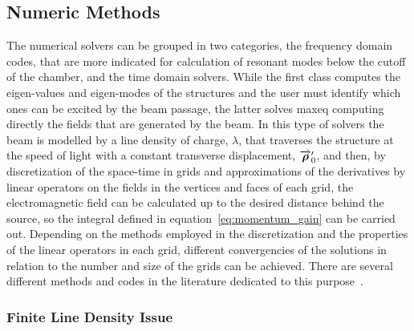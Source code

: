 \subsection{Numeric Methods}\label{ssec:numeric_methods}

    The numerical solvers can be grouped in two categories, the frequency domain codes, that are more indicated for calculation of resonant modes below the cutoff of the chamber, and the time domain solvers. While the first class computes the eigen-values and eigen-modes of the structures and the user must identify which ones can be excited by the beam passage, the latter solves \gls{maxeq} computing directly the fields that are generated by the beam. In this type of solvers the beam is modelled by a line density of charge, $\lambda$, that traverses the structure at the speed of light with a constant transverse displacement, $\overrightarrow{\boldsymbol{\rho}}'_0$, and then, by discretization of the space-time in grids and approximations of the derivatives by linear operators on the fields in the vertices and faces of each grid, the electromagnetic field can be calculated up to the desired distance behind the source, so the integral defined in equation~\eqref{eq:momentum_gain} can be carried out. Depending on the methods employed in the discretization and the properties of the linear operators in each grid, different convergencies of the solutions in relation to the number and size of the grids can be achieved. There are several different methods and codes in the literature dedicated to this purpose~\cite{some}.

\subsubsection{Finite Line Density Issue}

